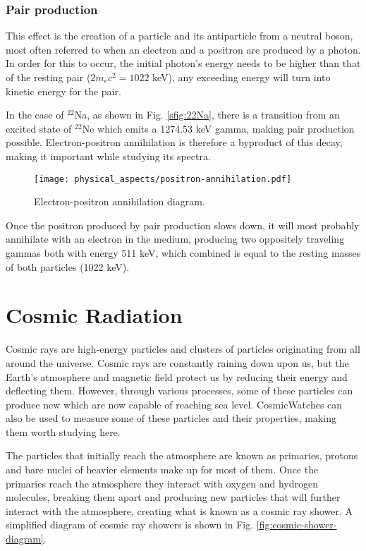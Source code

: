 \subsubsection{Pair production}

This effect is the creation of a particle and its antiparticle from a neutral boson, most often referred to when an electron and a positron are produced by a photon. In order for this to occur, the initial photon's energy needs to be higher than that of the resting pair ($2m_e c^2=1022$ \unit{\kilo\eV}), any exceeding energy will turn into kinetic energy for the pair.

In the case of $^{22}$Na, as shown in Fig. \ref{sfig:22Na}, there is a transition from an excited state of $^{22}$Ne which emits a 1274.53 \unit{\kilo\eV} gamma, making pair production possible. Electron-positron annihilation is therefore a byproduct of this decay, making it important while studying its spectra.

\begin{figure}[H]
  \centering
  \texttt{[image: physical\_aspects/positron-annihilation.pdf]}
  \caption{\label{fig:positron_annihilation_diagram}Electron-positron annihilation diagram.}
\end{figure}

Once the positron produced by pair production slows down, it will most probably annihilate with an electron in the medium, producing two oppositely traveling gammas both with energy 511 \unit{\kilo\eV}, which combined is equal to the resting masses of both particles (1022 \unit{\kilo\eV}).

\section{Cosmic Radiation}

Cosmic rays are high-energy particles and clusters of particles originating from all around the universe. Cosmic rays are constantly raining down upon us, but the Earth's atmosphere and magnetic field protect us by reducing their energy and deflecting them. However, through various processes, some of these particles can produce new which are now capable of reaching sea level. CosmicWatches can also be used to measure some of these particles and their properties, making them worth studying here.

The particles that initially reach the atmosphere are known as primaries, protons and bare nuclei of heavier elements make up for most of them. Once the primaries reach the atmosphere they interact with oxygen and hydrogen molecules, breaking them apart and producing new particles that will further interact with the atmosphere, creating what is known as a cosmic ray shower. A simplified diagram of cosmic ray showers is shown in Fig. \ref{fig:cosmic-shower-diagram}.

